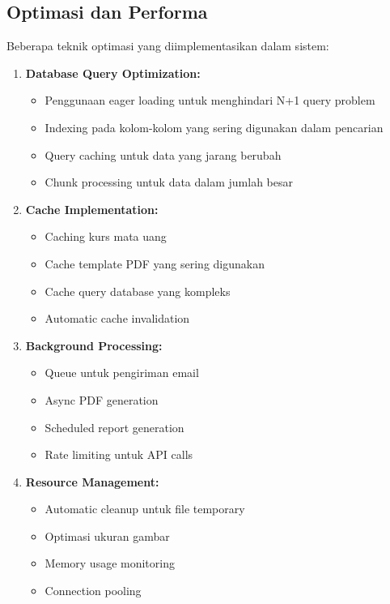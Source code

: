 \documentclass[a4paper]{report}
\begin{document}
\subsection{Optimasi dan Performa}
Beberapa teknik optimasi yang diimplementasikan dalam sistem:

\begin{enumerate}
\item \textbf{Database Query Optimization:}
    \begin{itemize}
    \item Penggunaan eager loading untuk menghindari N+1 query problem
    \item Indexing pada kolom-kolom yang sering digunakan dalam pencarian
    \item Query caching untuk data yang jarang berubah
    \item Chunk processing untuk data dalam jumlah besar
    \end{itemize}

\item \textbf{Cache Implementation:}
    \begin{itemize}
    \item Caching kurs mata uang
    \item Cache template PDF yang sering digunakan
    \item Cache query database yang kompleks
    \item Automatic cache invalidation
    \end{itemize}

\item \textbf{Background Processing:}
    \begin{itemize}
    \item Queue untuk pengiriman email
    \item Async PDF generation
    \item Scheduled report generation
    \item Rate limiting untuk API calls
    \end{itemize}

\item \textbf{Resource Management:}
    \begin{itemize}
    \item Automatic cleanup untuk file temporary
    \item Optimasi ukuran gambar
    \item Memory usage monitoring
    \item Connection pooling
    \end{itemize}
\end{enumerate}
\end{document}
